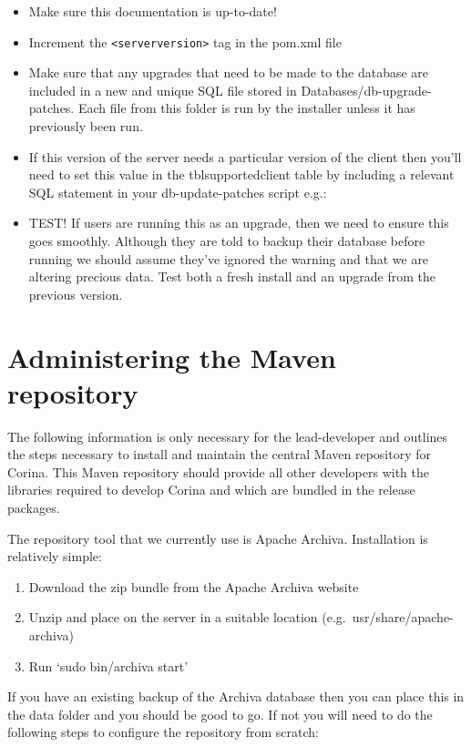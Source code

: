 \begin{itemize}
 \item Make sure this documentation is up-to-date! 
 \item Increment the \verb|<serverversion>| tag in the pom.xml file
 \item Make sure that any upgrades that need to be made to the database are included in a new and unique SQL file stored in Databases/db-upgrade-patches.  Each file from this folder is run by the installer unless it has previously been run.  
 \item If this version of the server needs a particular version of the client then you'll need to set this value in the tblsupportedclient table by including a relevant SQL statement in your db-update-patches script e.g.: 
 \item TEST!  If users are running this as an upgrade, then we need to ensure this goes smoothly.  Although they are told to backup their database before running we should assume they've ignored the warning and that we are altering precious data. Test both a fresh install and an upgrade from the previous version.
\end{itemize}



\section{Administering the Maven repository}
The following information is only necessary for the lead-developer and outlines the steps necessary to install and maintain the central Maven repository for Corina.  This Maven repository should provide all other developers with the libraries required to develop Corina and which are bundled in the release packages.

The repository tool that we currently use is Apache Archiva.  Installation is relatively simple:

\begin{enumerate}
 \item Download the zip bundle from the Apache Archiva website
 \item Unzip and place on the server in a suitable location (e.g.\ usr/share/apache-archiva)
 \item Run `sudo bin/archiva start'
\end{enumerate}

If you have an existing backup of the Archiva database then you can place this in the data folder and you should be good to go.  If not you will need to do the following steps to configure the repository from scratch:

